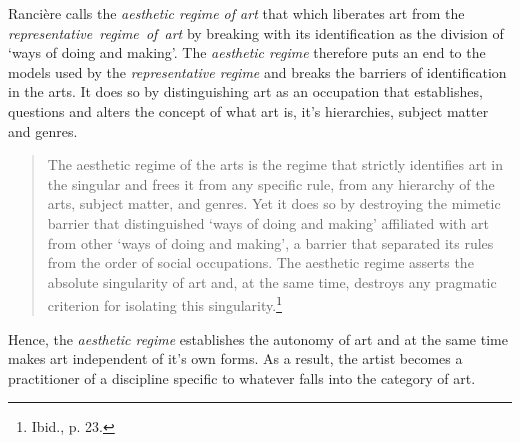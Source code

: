 Ranci\`{e}re calls the \emph{aesthetic regime of art} that which liberates art from the \mbox{\emph{representative regime of art}} by breaking with its identification as the division of `ways of doing and making'. The \emph{aesthetic regime} therefore puts an end to the models used by the \emph{representative regime} and breaks the barriers of identification in the arts. It does so by distinguishing art as an occupation that establishes, questions and alters the concept of what art is, it's hierarchies, subject matter and genres. 
\begin{quote}
The aesthetic regime of the arts is the regime that strictly identifies art in the singular and frees it from any specific rule, from any hierarchy of the arts, subject matter, and genres. Yet it does so by destroying the mimetic barrier that distinguished `ways of doing and making' affiliated with art from other `ways of doing and making', a barrier that separated its rules from the order of social occupations. The aesthetic regime asserts the absolute singularity of art and, at the same time, destroys any pragmatic criterion for isolating this singularity.\footnote{Ibid., p. 23.}
\end{quote}
Hence, the \emph{aesthetic regime} establishes the autonomy of art and at the same time makes art independent of it's own forms. As a result, the artist becomes a practitioner of a discipline specific to whatever falls into the category of art. 

